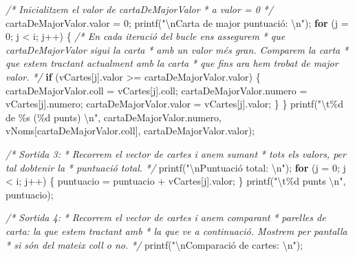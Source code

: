 \documentclass[]{book}
\newenvironment{Shaded}{\begin{snugshade}}{\end{snugshade}}
\newcommand{\CommentTok}[1]{\textcolor[rgb]{0.56,0.35,0.01}{\textit{#1}}}
\newcommand{\ControlFlowTok}[1]{\textcolor[rgb]{0.13,0.29,0.53}{\textbf{#1}}}
\newcommand{\DecValTok}[1]{\textcolor[rgb]{0.00,0.00,0.81}{#1}}
\newcommand{\NormalTok}[1]{#1}
\newcommand{\SpecialCharTok}[1]{\textcolor[rgb]{0.00,0.00,0.00}{#1}}
\newcommand{\StringTok}[1]{\textcolor[rgb]{0.31,0.60,0.02}{#1}}
\begin{document}
\begin{Shaded}
\begin{Highlighting}[]
    \CommentTok{/* Inicialitzem el valor de cartaDeMajorValor}
\CommentTok{     * a valor = 0}
\CommentTok{     */}
\NormalTok{    cartaDeMajorValor.valor = }\DecValTok{0}\NormalTok{;}
\NormalTok{    printf(}\StringTok{"}\SpecialCharTok{\textbackslash{}n}\StringTok{Carta de major puntuació: }\SpecialCharTok{\textbackslash{}n}\StringTok{"}\NormalTok{);}
    \ControlFlowTok{for}\NormalTok{ (j = }\DecValTok{0}\NormalTok{; j \textless{} i; j++) \{}
        \CommentTok{/* En cada iteració del bucle ens assegurem}
\CommentTok{         * que cartaDeMajorValor sigui la carta}
\CommentTok{         * amb un valor més gran. Comparem la carta}
\CommentTok{         * que estem tractant actualment amb la carta}
\CommentTok{         * que fins ara hem trobat de major valor.}
\CommentTok{         */}
        \ControlFlowTok{if}\NormalTok{ (vCartes[j].valor \textgreater{}= cartaDeMajorValor.valor) \{}
\NormalTok{            cartaDeMajorValor.coll = vCartes[j].coll;}
\NormalTok{            cartaDeMajorValor.numero = vCartes[j].numero;}
\NormalTok{            cartaDeMajorValor.valor = vCartes[j].valor;}
\NormalTok{        \}}
\NormalTok{    \}}
\NormalTok{    printf(}\StringTok{"}\SpecialCharTok{\textbackslash{}t}\StringTok{\%d de \%s (\%d punts) }\SpecialCharTok{\textbackslash{}n}\StringTok{"}\NormalTok{, cartaDeMajorValor.numero, vNoms[cartaDeMajorValor.coll], cartaDeMajorValor.valor);}

    \CommentTok{/* Sortida 3:}
\CommentTok{     * Recorrem el vector de cartes i anem sumant}
\CommentTok{     * tots els valors, per tal d\textquotesingle{}obtenir la }
\CommentTok{     * puntuació total.}
\CommentTok{     */}
\NormalTok{    printf(}\StringTok{"}\SpecialCharTok{\textbackslash{}n}\StringTok{Puntuació total: }\SpecialCharTok{\textbackslash{}n}\StringTok{"}\NormalTok{);}
    \ControlFlowTok{for}\NormalTok{ (j = }\DecValTok{0}\NormalTok{; j \textless{} i; j++) \{}
\NormalTok{        puntuacio = puntuacio + vCartes[j].valor;}
\NormalTok{    \}}
\NormalTok{    printf(}\StringTok{"}\SpecialCharTok{\textbackslash{}t}\StringTok{\%d punts }\SpecialCharTok{\textbackslash{}n}\StringTok{"}\NormalTok{, puntuacio);}
    
    \CommentTok{/* Sortida 4:}
\CommentTok{     * Recorrem el vector de cartes i anem comparant}
\CommentTok{     * parelles de carta: la que estem tractant amb}
\CommentTok{     * la que ve a continuació. Mostrem per pantalla}
\CommentTok{     * si són del mateix coll o no.}
\CommentTok{     */}
\NormalTok{    printf(}\StringTok{"}\SpecialCharTok{\textbackslash{}n}\StringTok{Comparació de cartes: }\SpecialCharTok{\textbackslash{}n}\StringTok{"}\NormalTok{);}
    

\end{Highlighting}
\end{Shaded}
\end{document}
